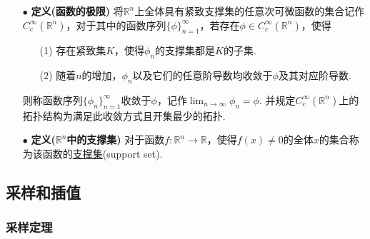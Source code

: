 \documentclass[main.tex]{subfiles}
\begin{document}
\begin{itemize}
    \item [\(\bullet\)] \textbf{定义(函数的极限)}
    \newline
    将\(\mathbb{R}^n\)上全体具有紧致支撑集的任意次可微函数的集合记作\(C_c^{\infty}\left(\mathbb{R}^n\right)\)，对于其中的函数序列\(\{\phi\}_{n=1}^{\infty}\)，若存在\(\phi \in C_c^{\infty}\left(\mathbb{R}^n\right)\)，使得
    \begin{itemize}
        \item [(1)] 存在紧致集\(K\)，使得\(\phi_n\)的支撑集都是\(K\)的子集.
        \item [(2)] 随着\(n\)的增加，\(\phi_n\)以及它们的任意阶导数均收敛于\(\phi\)及其对应阶导数.
    \end{itemize}
    则称函数序列\(\{\phi_n\}_{n=1}^{\infty}\)收敛于\(\phi\)，记作\(\displaystyle{\lim_{n \to \infty}\phi_n=\phi}\). 并规定\(C_c^{\infty}\left(\mathbb{R}^n\right)\)上的拓扑结构为满足此收敛方式且开集最少的拓扑.
\end{itemize}

\begin{itemize}
    \item [\(\bullet\)] \textbf{定义(\(\mathbb{R}^n\)中的支撑集)}
    \newline
    对于函数\(f:\mathbb{R}^n \to \mathbb{R}\)，使得\(f(x) \neq 0\)的全体\(x\)的集合称为该函数的\uline{支撑集}(support set).
\end{itemize}

\subsection{采样和插值}

\subsubsection{采样定理}
\end{document}

